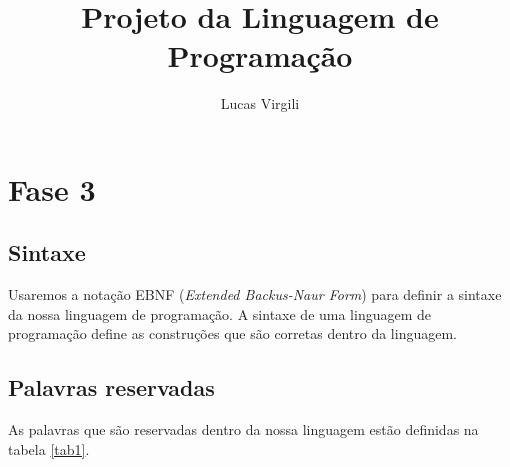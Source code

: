 \documentclass[a4 paper, 12pt]{article}
\title{Projeto da Linguagem de Programa\c c\~ao}
\author{Lucas Virgili}
\date{}
\begin{document}
\maketitle
\tableofcontents
\newpage
\section{Fase 3}
\subsection{Sintaxe}

Usaremos a nota\c c\~ao EBNF (\emph{Extended Backus-Naur Form}) para
definir a sintaxe da nossa linguagem de programa\c c\~ao. A sintaxe de
uma linguagem de programa\c c\~ao define as constru\c c\~oes que s\~ao
corretas dentro da linguagem.

\subsection{Palavras reservadas}

As palavras que s\~ao reservadas dentro da nossa linguagem est\~ao
definidas na tabela \ref{tab1}.
\end{document}
